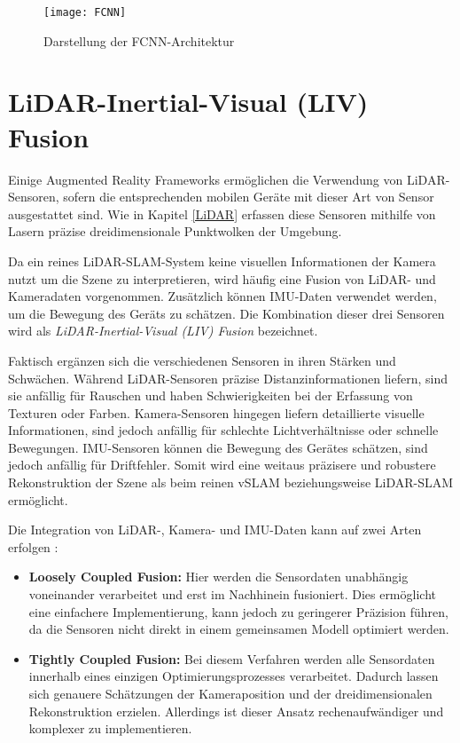 \begin{figure}
    \centering
    \texttt{[image: FCNN]}
    \caption{Darstellung der FCNN-Architektur \cite{long2014fcnn}\label{fig:FCNN}}\par
\end{figure}

\section{LiDAR-Inertial-Visual (LIV) Fusion} \label{sec:LIV}

Einige Augmented Reality Frameworks ermöglichen die Verwendung von LiDAR-Sensoren, sofern die entsprechenden mobilen Geräte mit dieser Art von Sensor ausgestattet sind. Wie in Kapitel \ref{LiDAR} erfassen diese Sensoren mithilfe von Lasern präzise dreidimensionale Punktwolken der Umgebung. \cite{appledevdoc, doerner2022virtual}

Da ein reines LiDAR-SLAM-System keine visuellen Informationen der Kamera nutzt um die Szene zu interpretieren, wird häufig eine Fusion von LiDAR- und Kameradaten vorgenommen. Zusätzlich können IMU-Daten verwendet werden, um die Bewegung des Geräts zu schätzen. Die Kombination dieser drei Sensoren wird als \emph{LiDAR-Inertial-Visual (LIV) Fusion} bezeichnet. \cite{zhang2024lidarslam}

Faktisch ergänzen sich die verschiedenen Sensoren in ihren Stärken und Schwächen. Während LiDAR-Sensoren präzise Distanzinformationen liefern, sind sie anfällig für Rauschen und haben Schwierigkeiten bei der Erfassung von Texturen oder Farben. Kamera-Sensoren hingegen liefern detaillierte visuelle Informationen, sind jedoch anfällig für schlechte Lichtverhältnisse oder schnelle Bewegungen. IMU-Sensoren können die Bewegung des Gerätes schätzen, sind jedoch anfällig für Driftfehler. Somit wird eine weitaus präzisere und robustere Rekonstruktion der Szene als beim reinen vSLAM beziehungsweise LiDAR-SLAM ermöglicht. \cite{zhang2024lidarslam}

Die Integration von LiDAR-, Kamera- und IMU-Daten kann auf zwei Arten erfolgen \cite{zhang2024lidarslam}:
\begin{itemize}
    \item \textbf{Loosely Coupled Fusion:} Hier werden die Sensordaten unabhängig voneinander verarbeitet und erst im Nachhinein fusioniert. Dies ermöglicht eine einfachere Implementierung, kann jedoch zu geringerer Präzision führen, da die Sensoren nicht direkt in einem gemeinsamen Modell optimiert werden.
    \item \textbf{Tightly Coupled Fusion:} Bei diesem Verfahren werden alle Sensordaten innerhalb eines einzigen Optimierungsprozesses verarbeitet. Dadurch lassen sich genauere Schätzungen der Kameraposition und der dreidimensionalen Rekonstruktion erzielen. Allerdings ist dieser Ansatz rechenaufwändiger und komplexer zu implementieren.
\end{itemize}


